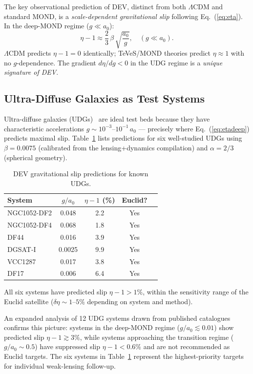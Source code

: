 \documentclass[aps,prd,twocolumn,showpacs,superscriptaddress]{revtex4-2}
\newcommand{\aO}{a_0}
\newcommand{\LCDM}{$\Lambda$CDM}
\begin{document}
The key observational prediction of DEV, distinct from both
\LCDM{} and standard MOND, is a \emph{scale-dependent gravitational slip}
following Eq.~(\ref{eq:eta}).
In the deep-MOND regime ($g \ll \aO$):
\begin{equation}
  \eta - 1 \approx \frac{2}{3}\,\beta\,\sqrt{\frac{\aO}{g}},
  \quad (g \ll \aO).
  \label{eq:etadeep}
\end{equation}
\LCDM{} predicts $\eta - 1 = 0$ identically;
TeVeS/MOND theories predict $\eta \approx 1$ with no $g$-dependence.
The gradient $d\eta/dg < 0$ in the UDG regime is a
\emph{unique signature of DEV}.

\subsection{Ultra-Diffuse Galaxies as Test Systems}

Ultra-diffuse galaxies (UDGs)~\cite{vanDokkum2015} are ideal test beds
because they have characteristic accelerations
$g \sim 10^{-3}$--$10^{-1}\,\aO$ —
precisely where Eq.~(\ref{eq:etadeep}) predicts maximal slip.
Table~\ref{tab:udg} lists predictions for six well-studied UDGs using
$\beta = 0.0075$ (calibrated from the lensing+dynamics compilation)
and $\alpha = 2/3$ (spherical geometry).

\begin{table}[h]
\caption{DEV gravitational slip predictions for known UDGs.}
\label{tab:udg}
\begin{ruledtabular}
\begin{tabular}{lcccc}
System & $g/\aO$ & $\eta-1$ (\%) & Euclid? \\
\hline
NGC1052-DF2 & 0.048 & 2.2 & Yes \\
NGC1052-DF4 & 0.068 & 1.8 & Yes \\
DF44        & 0.016 & 3.9 & Yes \\
DGSAT-I     & 0.0025 & 9.9 & Yes \\
VCC1287     & 0.017  & 3.8 & Yes \\
DF17        & 0.006  & 6.4 & Yes \\
\end{tabular}
\end{ruledtabular}
\end{table}

All six systems have predicted slip $\eta - 1 > 1\%$,
within the sensitivity range of the Euclid satellite
($\delta\eta \sim 1$--$5\%$ depending on system and method).

An expanded analysis of 12 UDG systems drawn from published
catalogues \cite{vanDokkum2015,Lelli2016} confirms this
picture: systems in the deep-MOND regime ($g/\aO \lesssim 0.01$)
show predicted slip $\eta - 1 \gtrsim 3\%$, while systems
approaching the transition regime ($g/\aO \sim 0.5$) have
suppressed slip $\eta - 1 < 0.6\%$ and are not recommended
as Euclid targets. The six systems in Table~\ref{tab:udg}
represent the highest-priority targets for individual
weak-lensing follow-up.
\end{document}
